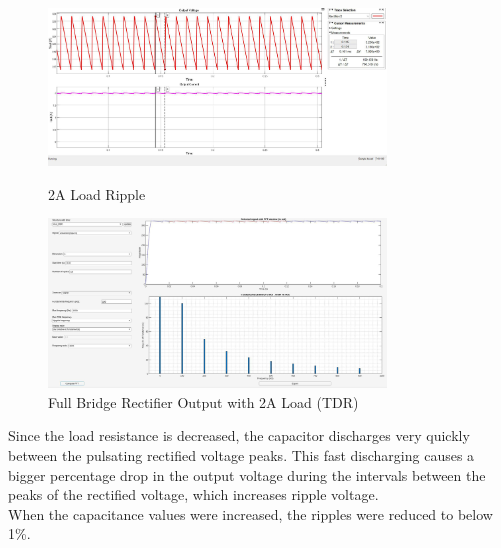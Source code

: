 \documentclass[12pt]{article}
\begin{document}
\begin{figure}[h]
    \centering
    \includegraphics[width=0.8\textwidth]{img/2A.jpg}
    \caption{2A Load Ripple}

    \centering
    \includegraphics[width=0.8\textwidth]{img/FBR_2A.jpg}
    \caption{Full Bridge Rectifier Output with 2A Load (TDR)}
\end{figure}
\newpage

Since the load resistance is decreased, the capacitor discharges very quickly between the pulsating rectified voltage peaks. This fast discharging causes a bigger percentage drop in the output voltage during the intervals between the peaks of the rectified voltage, which increases ripple voltage.\\

When the capacitance values were increased, the ripples were reduced to below 1\%.
\end{document}
